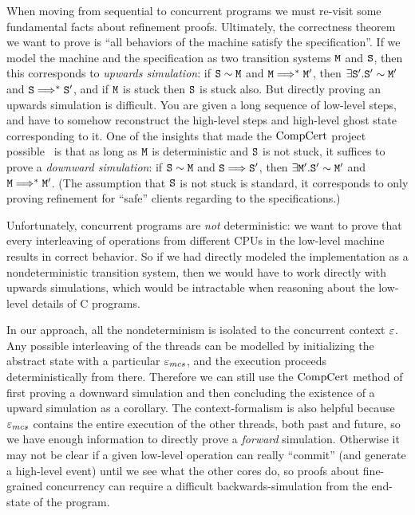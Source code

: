When moving from sequential to concurrent programs we must
re-visit some fundamental facts about refinement proofs.  Ultimately,
the correctness theorem we want to prove is ``all behaviors of the
machine satisfy the specification''. If we model the machine and the
specification as two transition systems ${\mathrm{\texttt{M}}}$ and ${\mathrm{\texttt{S}}}$, then this
corresponds to \emph{upwards simulation}: if ${\mathrm{\texttt{S}}} \sim {\mathrm{\texttt{M}}}$ and 
${\mathrm{\texttt{M}}} \Longrightarrow^* {\mathrm{\texttt{M}}}'$, then $\exists {\mathrm{\texttt{S}}}'. {\mathrm{\texttt{S}}}' \sim {\mathrm{\texttt{M}}}'$ and
 ${\mathrm{\texttt{S}}} \Longrightarrow^* {\mathrm{\texttt{S}}}'$, and if ${\mathrm{\texttt{M}}}$ is stuck then ${\mathrm{\texttt{S}}}$ is stuck also.
But directly proving an upwards simulation is difficult. You are given
a long sequence of low-level steps, and have to somehow reconstruct
the high-level steps and high-level ghost state corresponding to
it. One of the insights that made the $\mathrm{CompCert}$ project
possible~\cite{Leroy-backend} is that as long as ${\mathrm{\texttt{M}}}$ is deterministic
and ${\mathrm{\texttt{S}}}$ is not stuck, it suffices to prove a \emph{downward
  simulation}: if ${\mathrm{\texttt{S}}} \sim {\mathrm{\texttt{M}}}$ and ${\mathrm{\texttt{S}}} \Longrightarrow {\mathrm{\texttt{S}}}'$, then $\exists
{\mathrm{\texttt{M}}}'. {\mathrm{\texttt{S}}}' \sim {\mathrm{\texttt{M}}}'$ and ${\mathrm{\texttt{M}}} \Longrightarrow^* {\mathrm{\texttt{M}}}'$. (The assumption that ${\mathrm{\texttt{S}}}$
is not stuck is standard, it corresponds to only proving refinement
for ``safe'' clients regarding to the specifications.)

Unfortunately, concurrent programs are \emph{not} deterministic: we
want to prove that every interleaving of operations from
different CPUs in the low-level machine results in correct
behavior. So if we had directly modeled the implementation as a
nondeterministic transition system, then we would have to work
directly with upwards simulations, which would be intractable when
reasoning about the low-level details of C programs.

In our approach, all the nondeterminism is isolated to the concurrent
context ${\varepsilon}$. Any possible interleaving of the threads can be
modelled by initializing the abstract state with a particular
${\varepsilon}_{mcs}$, and the execution proceeds deterministically from
there. Therefore we can still use the $\mathrm{CompCert}$ method of first
proving a downward simulation and then concluding the existence of a
upward simulation as a corollary.
The context-formalism is also helpful because ${\varepsilon}_{mcs}$ contains
the entire execution of the other threads, both past and future, so we
have enough information to directly prove a \emph{forward}
simulation. Otherwise it may not be clear if a given low-level
operation can really ``commit'' (and generate a high-level event)
until we see what the other cores do, so proofs about fine-grained
concurrency can require a difficult backwards-simulation
from the end-state of the program.~\cite{DGLMQueue}

